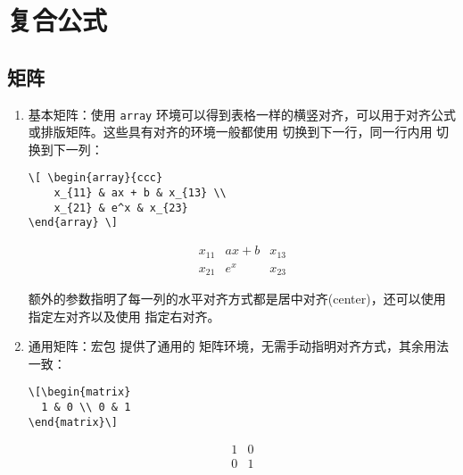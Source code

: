 \section{复合公式}

\subsection{矩阵}

\begin{enumerate}
    
\item 基本矩阵：使用 \verb|array| 环境可以得到表格一样的横竖对齐，可以用于对齐公式或排版矩阵。这些具有对齐的环境一般都使用 \boxforcmd{\\\\} 切换到下一行，同一行内用 \boxforcmd{&} 切换到下一列：

\begin{tcolorbox}[sidebyside]
\begin{lstlisting}
\[ \begin{array}{ccc}
    x_{11} & ax + b & x_{13} \\
    x_{21} & e^x & x_{23} 
\end{array} \]
\end{lstlisting} 

\tcblower

\[ \begin{array}{ccc}
    x_{11} & ax + b & x_{13} \\
    x_{21} & e^x & x_{23} 
\end{array} \]
\end{tcolorbox}

额外的参数指明了每一列的水平对齐方式都是居中对齐(center)，还可以使用  指定左对齐以及使用  指定右对齐。

\item 通用矩阵：宏包  提供了通用的  矩阵环境，无需手动指明对齐方式，其余用法一致：

\begin{tcolorbox}[sidebyside]
\begin{lstlisting}
\[\begin{matrix} 
  1 & 0 \\ 0 & 1
\end{matrix}\]
\end{lstlisting} 

\tcblower

\[\begin{matrix} 1 & 0 \\ 0 & 1
\end{matrix}\]
\end{tcolorbox}


\end{enumerate}
